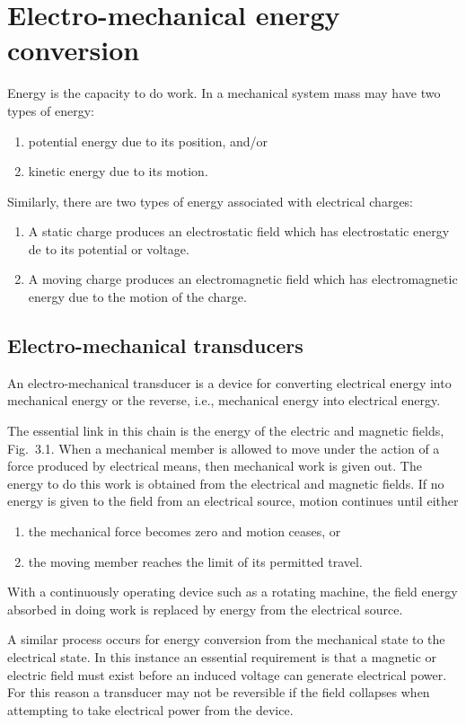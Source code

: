 \documentclass[a4paper,numbers=noenddot,12pt]{scrbook}
\begin{document}
\chapter{Electro-mechanical energy conversion}
Energy is the capacity to do work. In a mechanical system mass may have two types of energy:
\begin{enumerate}
    \item potential energy due to its position, and/or
    \item kinetic energy due to its motion.
\end{enumerate}

Similarly, there are two types of energy associated with electrical charges:
\begin{enumerate}
    \item A static charge produces an electrostatic field which has electrostatic energy de to its potential or voltage.
    \item A moving charge produces an electromagnetic field which has electromagnetic energy due to the motion of the charge.
\end{enumerate}

\section{Electro-mechanical transducers}
An electro-mechanical transducer is a device for converting electrical energy into mechanical energy or the reverse, i.e., mechanical energy into electrical energy.

The essential link in this chain is the energy of the electric and magnetic fields, Fig.\ 3.1. When a mechanical member is allowed to move under the action of a force produced by electrical means, then mechanical work is given out. The energy to do this work is obtained from the electrical and magnetic fields. If no energy is given to the field from an electrical source, motion continues until either
\begin{enumerate}
    \item the mechanical force becomes zero and motion ceases, or
    \item the moving member reaches the limit of its permitted travel.
\end{enumerate}

With a continuously operating device such as a rotating machine, the field energy absorbed in doing work is replaced by energy from the electrical source.

A similar process occurs for energy conversion from the mechanical state to the electrical state. In this instance an essential requirement is that a magnetic or electric field must exist before an induced voltage can generate electrical power. For this reason a transducer may not be reversible if the field collapses when attempting to take electrical power from the device.
\end{document}
